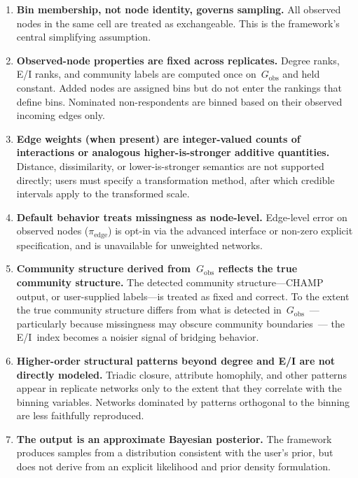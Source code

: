 \documentclass[11pt]{article}
\newcommand{\Gobs}{G_{\text{obs}}}
\newcommand{\piedge}{\pi_{\text{edge}}}
\begin{document}
\begin{enumerate}[leftmargin=*, itemsep=4pt]
  \item \textbf{Bin membership, not node identity, governs sampling.} All observed nodes in the same cell are treated as exchangeable. This is the framework's central simplifying assumption.

  \item \textbf{Observed-node properties are fixed across replicates.} Degree ranks, E/I ranks, and community labels are computed once on~$\Gobs$ and held constant. Added nodes are assigned bins but do not enter the rankings that define bins. Nominated non-respondents are binned based on their observed incoming edges only.

  \item \textbf{Edge weights (when present) are integer-valued counts of interactions or analogous higher-is-stronger additive quantities.} Distance, dissimilarity, or lower-is-stronger semantics are not supported directly; users must specify a transformation method, after which credible intervals apply to the transformed scale.

  \item \textbf{Default behavior treats missingness as node-level.} Edge-level error on observed nodes ($\piedge$) is opt-in via the advanced interface or non-zero explicit specification, and is unavailable for unweighted networks.

  \item \textbf{Community structure derived from~$\Gobs$ reflects the true community structure.} The detected community structure---CHAMP output, or user-supplied labels---is treated as fixed and correct. To the extent the true community structure differs from what is detected in~$\Gobs$~--- particularly because missingness may obscure community boundaries~--- the E/I~index becomes a noisier signal of bridging behavior.

  \item \textbf{Higher-order structural patterns beyond degree and E/I are not directly modeled.} Triadic closure, attribute homophily, and other patterns appear in replicate networks only to the extent that they correlate with the binning variables. Networks dominated by patterns orthogonal to the binning are less faithfully reproduced.

  \item \textbf{The output is an approximate Bayesian posterior.} The framework produces samples from a distribution consistent with the user's prior, but does not derive from an explicit likelihood and prior density formulation.
\end{enumerate}
\end{document}
